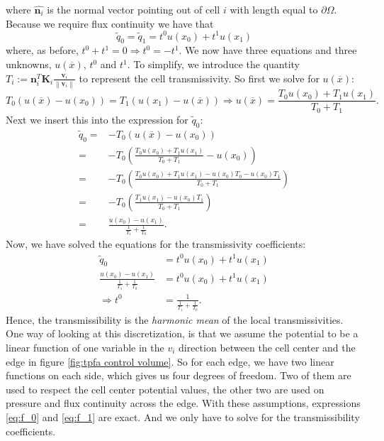 \documentclass[../Main/main.tex]{subfiles}
\begin{document}
	where $\hat{\bm{n}_i}$ is the normal vector pointing out of cell $i$ with length equal to $\partial \Omega$.
	Because we require flux continuity we have that 
	\begin{equation}
		\tilde{q}_0 = \tilde{q}_1 = t^0 u(x_0) + t^1 u(x_1)
	\end{equation}
	where, as before, $t^0 + t^1 = 0 \Rightarrow t^0 = -t^1$. We now have three equations and three unknowns, $u(\overline{x})$, $t^0$ and $t^1$. To simplify, we introduce the quantity $T_i := \bm{n}_i^T \bm{K}_i  \frac{\bm{v}_i}{\left \| \bm{v}_i \right \|} $ to represent the cell transmissivity. So first we solve for $u(\overline{x})$:
	\begin{equation}
		T_0(u(\overline{x})-u(x_0)) = T_1(u(x_1)-u(\overline{x})) \Rightarrow u(\overline{x}) = \frac{T_0 u(x_0) + T_1 u(x_1)}{T_0 + T_1}.
	\end{equation}
	Next we insert this into the expression for $\tilde{q}_0$:
	\begin{equation}
		\begin{aligned}
			\tilde{q}_0 =& -T_0(u(\overline{x})-u(x_0)) \\
			=& -T_0\left (\frac{T_0 u(x_0) + T_1 u(x_1)}{T_0 + T_1} - u(x_0)\right )\\
			=& -T_0\left (\frac{T_0 u(x_0) + T_1 u(x_1) - u(x_0)T_0 - u(x_0)T_1}{T_0 + T_1}\right ) \\
			=& -T_0\left (\frac{ T_1 u(x_1)  - u(x_0)T_1}{T_0 + T_1}\right)\\
			=& \frac{u(x_0)-u(x_1)}{\frac{1}{T_1} + \frac{1}{T_0}}.
		\end{aligned}
	\end{equation}
	Now, we have solved the equations for the transmissivity coefficients:
	\begin{equation}\label{eq:harmonic mean}
		\begin{aligned}
			\tilde{q}_0 &= t^0 u(x_0) + t^1 u(x_1) \\
			\frac{u(x_0)-u(x_1)}{\frac{1}{T_1} + \frac{1}{T_0}} &= t^0 u(x_0) + t^1 u(x_1) \\
			\Rightarrow t^0 &= \frac{1}{\frac{1}{T_1} + \frac{1}{T_0}}.
		\end{aligned}
	\end{equation} 
	Hence, the transmissibility is the \emph{harmonic mean} of the local transmissivities. One way of looking at this discretization, is that we assume the potential to be a linear function of one variable in the $v_i$ direction between the cell center and the edge in figure \ref{fig:tpfa control volume}. So for each edge, we have two linear functions on each side, which gives us four degrees of freedom. Two of them are used to respect the cell center potential values, the other two are used on pressure and flux continuity across the edge. With these assumptions, expressions \eqref{eq:f_0} and \eqref{eq:f_1} are exact. And we only have to solve for the transmissibility coefficients.\par
\end{document}
